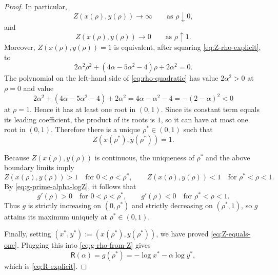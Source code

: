 \documentclass[10pt,a4paper]{amsart}
\begin{document}
\begin{proof}
In particular,
\[
Z(x(\rho),y(\rho))\longrightarrow\infty
\qquad\text{as }\rho\downarrow 0,
\]
and
\[
Z(x(\rho),y(\rho))\longrightarrow 0
\qquad\text{as }\rho\uparrow 1.
\]
Moreover, \(Z(x(\rho),y(\rho))=1\) is equivalent, after squaring
\eqref{eq:Z-rho-explicit}, to
\begin{equation}\label{eq:rho-quadratic}
    2\alpha^2\rho^2+(4\alpha-5\alpha^2-4)\rho+2\alpha^2=0.
\end{equation}
The polynomial on the left-hand side of \eqref{eq:rho-quadratic} has value
\(2\alpha^2>0\) at \(\rho=0\) and value
\[
2\alpha^2+(4\alpha-5\alpha^2-4)+2\alpha^2
=
4\alpha-\alpha^2-4
=
-(2-\alpha)^2<0
\]
at \(\rho=1\). Hence it has at least one root in \((0,1)\). Since its constant
term equals its leading coefficient, the product of its roots is \(1\), so it
can have at most one root in \((0,1)\). Therefore there is a unique
\(\rho^*\in(0,1)\) such that
\[
Z(x(\rho^*),y(\rho^*))=1.
\]

Because \(Z(x(\rho),y(\rho))\) is continuous, the uniqueness of \(\rho^*\) and
the above boundary limits imply
\[
Z(x(\rho),y(\rho))>1 \quad \text{for } 0<\rho<\rho^*,
\qquad
Z(x(\rho),y(\rho))<1 \quad \text{for } \rho^*<\rho<1.
\]
By \eqref{eq:g-prime-alpha-logZ}, it follows that
\[
g'(\rho)>0 \quad \text{for } 0<\rho<\rho^*,
\qquad
g'(\rho)<0 \quad \text{for } \rho^*<\rho<1.
\]
Thus \(g\) is strictly increasing on \((0,\rho^*)\) and strictly decreasing on
\((\rho^*,1)\), so \(g\) attains its maximum uniquely at \(\rho^*\in(0,1)\).

Finally, setting \((x^*,y^*):=(x(\rho^*),y(\rho^*))\), we have proved
\eqref{eq:Z-equals-one}. Plugging this into \eqref{eq:g-rho-from-Z} gives
\[
\mathsf R(\alpha)=g(\rho^*)=-\log x^*-\alpha\log y^*,
\]
which is \eqref{eq:R-explicit}.
\end{proof}
\end{document}
